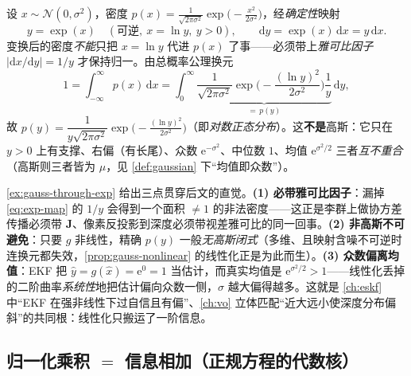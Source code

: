 \begin{example}[$y=\exp(x)$：高斯被确定性非线性掰成非高斯]\label{ex:gauss-through-exp}
设 $x\sim\mathcal{N}(0,\sigma^2)$，密度 $p(x)=\tfrac{1}{\sqrt{2\pi\sigma^2}}\exp\!\big(-\tfrac{x^2}{2\sigma^2}\big)$，经\emph{确定性}映射
\begin{equation}
  y=\exp(x)\quad(\text{可逆},\ x=\ln y,\ y>0),\qquad \mathrm{d}y=\exp(x)\,\mathrm{d}x=y\,\mathrm{d}x.
  \label{eq:exp-map}
\end{equation}
变换后的密度\emph{不能}只把 $x=\ln y$ 代进 $p(x)$ 了事——必须带上\emph{雅可比因子} $|\mathrm{d}x/\mathrm{d}y|=1/y$ 才保持归一。由总概率公理换元
\begin{equation}
  1=\int_{-\infty}^{\infty}\!p(x)\,\mathrm{d}x
   =\int_{0}^{\infty}\underbrace{\frac{1}{\sqrt{2\pi\sigma^2}}\exp\!\Big(-\frac{(\ln y)^2}{2\sigma^2}\Big)\frac{1}{y}}_{=\,p(y)}\,\mathrm{d}y,
  \label{eq:lognormal}
\end{equation}
故 $p(y)=\dfrac{1}{y\sqrt{2\pi\sigma^2}}\exp\!\big(-\tfrac{(\ln y)^2}{2\sigma^2}\big)$（即\emph{对数正态分布}）。这\textbf{不是}高斯：它只在 $y>0$ 上有支撑、右偏（有长尾）、众数 $\mathrm{e}^{-\sigma^2}$、中位数 $1$、均值 $\mathrm{e}^{\sigma^2/2}$ 三者\emph{互不重合}（高斯则三者皆为 $\mu$，见 \cref{def:gaussian} 下“均值即众数”）。
\end{example}

\begin{insight}
\cref{ex:gauss-through-exp} 给出三点贯穿后文的直觉。\textbf{(1) 必带雅可比因子}：漏掉 \cref{eq:exp-map} 的 $1/y$ 会得到一个面积 $\ne 1$ 的非法密度——这正是李群上做协方差传播必须带 $\mathbf{J}$、像素反投影到深度必须带视差雅可比的同一回事。\textbf{(2) 非高斯不可避免}：只要 $g$ 非线性，精确 $p(y)$ 一般\emph{无高斯闭式}（多维、且映射含噪不可逆时连换元都失效，\cref{prop:gauss-nonlinear} 的线性化正是为此而生）。\textbf{(3) 众数偏离均值}：EKF 把 $\hat{y}=g(\hat{x})=\mathrm{e}^{0}=1$ 当估计，而真实均值是 $\mathrm{e}^{\sigma^2/2}>1$——线性化丢掉的二阶曲率\emph{系统性}地把估计偏向众数一侧，$\sigma$ 越大偏得越多。这就是 \cref{ch:eskf} 中“EKF 在强非线性下过自信且有偏”、\cref{ch:vo} 立体匹配“近大远小使深度分布偏斜”的共同根：线性化只搬运了一阶信息。
\end{insight}

\subsection{归一化乘积 \texorpdfstring{$=$}{=} 信息相加（正规方程的代数核）}
\label{sec:est-info-add}

